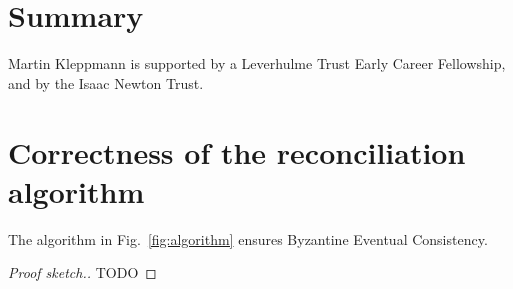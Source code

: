 \documentclass[manuscript,anonymous]{acmart}
\begin{document}


\section{Summary}

\begin{acks}
Martin Kleppmann is supported by a Leverhulme Trust Early Career Fellowship, and by the Isaac Newton Trust.
\end{acks}




\appendix
\section{Correctness of the reconciliation algorithm}
\begin{theorem}
The algorithm in Fig.~\ref{fig:algorithm} ensures Byzantine Eventual Consistency.
\end{theorem}
\begin{proof}[Proof sketch.]
TODO


\end{proof}
\end{document}
